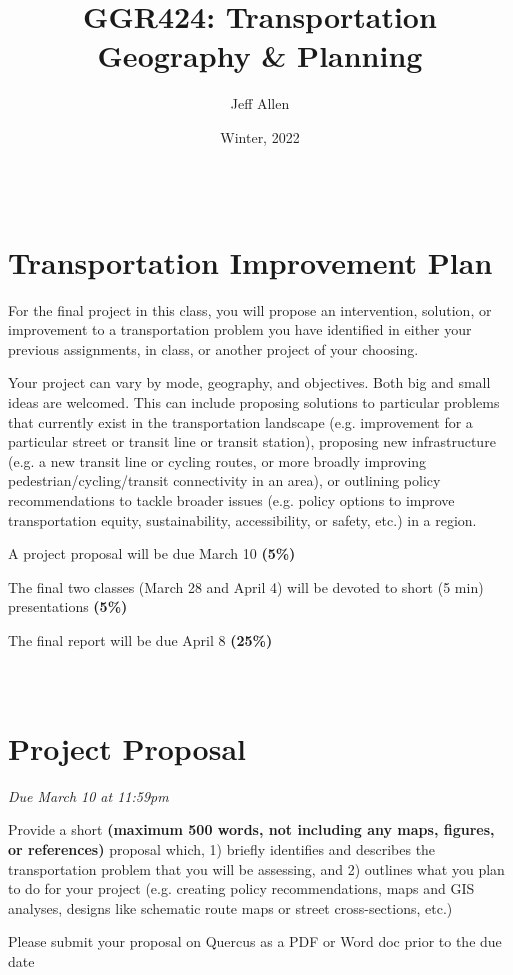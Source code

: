 \documentclass[11pt]{article}
\title{\textbf{GGR424: Transportation Geography \& Planning}}
\author{Jeff Allen}
\date{Winter, 2022}
\begin{document}
	
	\allsectionsfont{\sffamily}
	
	\section*{\\Transportation Improvement Plan}
	
	
	For the final project in this class, you will propose an intervention, solution, or improvement to a transportation problem you have identified in either your previous assignments, in class, or another project of your choosing. 
	
	Your project can vary by mode, geography, and objectives. Both big and small ideas are welcomed. This can include proposing solutions to particular problems that currently exist in the transportation landscape (e.g. improvement for a particular street or transit line or transit station), proposing new infrastructure (e.g. a new transit line or cycling routes, or more broadly improving pedestrian/cycling/transit connectivity in an area), or outlining policy recommendations to tackle broader issues (e.g. policy options to improve transportation equity, sustainability, accessibility, or safety, etc.) in a region.
	
	A project proposal will be due March 10 \textbf{(5\%)}
	
	The final two classes (March 28 and April 4) will be devoted to short (5 min) presentations \textbf{(5\%)}
	
	The final report will be due April 8 \textbf{(25\%)}
	
	
	\newpage
	
	
	
	
	
	
	\section*{\\Project Proposal}
	
	\textit{Due March 10 at 11:59pm}
	
	Provide a short \textbf{(maximum 500 words, not including any maps, figures, or references)} proposal which, 1) briefly identifies and describes the transportation problem that you will be assessing, and 2) outlines what you plan to do for your project (e.g. creating policy recommendations, maps and GIS analyses, designs like schematic route maps or street cross-sections, etc.)
	
	Please submit your proposal on Quercus as a PDF or Word doc prior to the due date
\end{document}
